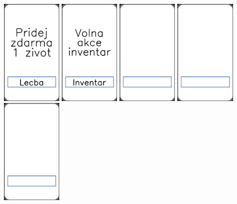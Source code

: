 \documentclass[a4paper]{article}
\begin{document}
	\includegraphics[width=3.0cm]{img-9_1}
	\includegraphics[width=3.0cm]{img-9_2}
	\includegraphics[width=3.0cm]{img-9_3}
	\includegraphics[width=3.0cm]{img-9_4}
	\includegraphics[width=3.0cm]{img-9_5}
\end{document}
